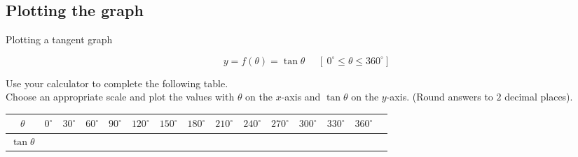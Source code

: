 \subsection*{Plotting the graph}
\begin{wex}
{Plotting a tangent graph}
{
\begin{equation*}
 y=f(\theta)=\tan  \theta~~~~~~[~0^{\circ} \leq \theta \leq 360^{\circ}]
\end{equation*}

Use your calculator to complete the following table. \\
Choose an appropriate scale and plot the values with $\theta $ on the $x$-axis and $\tan\theta$ on the $y$-axis. (Round answers to $2$ decimal places). 

\begin{table}[H]
\begin{tabular}{|c|m{0.4cm}|m{0.4cm}|m{0.4cm}|m{0.4cm}|m{0.5cm}|m{0.5cm}|m{0.5cm}|m{0.5cm}|m{0.5cm}|m{0.5cm}|m{0.5cm}|m{0.5cm}|m{0.5cm}|} \hline

\footnotesize$\theta $&
\footnotesize$0^{\circ }$&
\footnotesize$30^{\circ }$&
\footnotesize$60^{\circ }$&
\footnotesize$90^{\circ }$&
\footnotesize$120^{\circ }$&
\footnotesize$150^{\circ }$&
\footnotesize$180^{\circ }$&
\footnotesize$210^{\circ }$&
\footnotesize$240^{\circ }$&
\footnotesize$270^{\circ }$&
\footnotesize$300^{\circ }$&
\footnotesize$330^{\circ }$&
\footnotesize$360^{\circ }$
\\ \hline

\footnotesize$\tan\theta $&
&
&
&
&
&
&
&
&
&
&
&
&
&

 \hline
\end{tabular}


\end{table}}
\end{wex}
